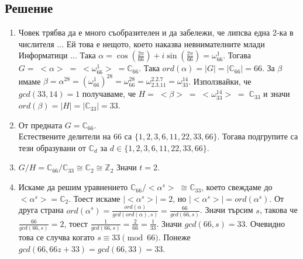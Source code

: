 \documentclass[12pt]{article}
\begin{document}
\subsection{Решение}
\begin{enumerate}[label=\alph*)]
    \item Човек трябва да е много съобразителен и да забележи, че липсва една 2-ка в числителя ... Ей това е нещото, което наказва невнимателните млади Информатици ...
    Така \(\alpha = \cos\left(\displaystyle\frac{2\pi}{66}\right) + i\sin\left(\displaystyle\frac{2\pi}{66}\right) = \omega_{66}^1\).
    Тогава \(G = \; <\alpha> \; = \; <\omega_{66}^1> \; = \mathbb{C}_{66}\).
    Така \(ord(\alpha) = |G| = |\mathbb{C}_{66}| = 66\).
    За \(\beta\) имаме \(\beta = \alpha^{28} = (\omega_{66}^1)^{28} = \omega_{66}^{28} = \omega_{2.3.11}^{2.2.7} = \omega_{33}^{14}\). Използвайки, че \(gcd(33, 14) = 1\) получаваме, че \(H = \; <\beta> \; = \; <\omega_{33}^{14}> \; = \; \mathbb{C}_{33}\) и значи
    \(ord(\beta) = |H| = |\mathbb{C}_{33}| = 33\).
    \item От предната \(G = \mathbb{C}_{66}\). \\
    Естествените делители на \(66\) са \(\{1, 2, 3, 6, 11, 22, 33, 66\}\).
    Тогава подгрупите са тези образувани от \(\mathbb{C}_d\) за \(d \in \{1, 2, 3, 6, 11, 22, 33, 66\}\).
    \item \(G / H = \mathbb{C}_{66} / \mathbb{C}_{33} \cong \mathbb{C}_{2} \cong \mathbb{Z}_2\) Значи \(t = 2\).
    \item Искаме да решим уравнението \(\mathbb{C}_{66} / <\alpha^s> \; \cong \mathbb{C}_{33}\), което свеждаме до \(<\alpha^s> = \mathbb{C}_{2}\).
    Тоест искаме \(|<\alpha^s>| = 2\), но \(|<\alpha^s>| = ord(\alpha^s)\).
    От друга страна \(ord(\alpha^s) = \displaystyle\frac{ord(\alpha)}{gcd(ord(\alpha), s)} = \displaystyle\frac{66}{gcd(66, s)}\). Значи търсим \(s\), такова че
    \(\displaystyle\frac{66}{gcd(66, s)} = 2\), тоест \(\displaystyle\frac{1}{gcd(66, s)} = \displaystyle\frac{2}{66} = \displaystyle\frac{1}{33}\). Значи \(gcd(66, s) = 33\).
    Очевидно това се случва когато \(s \equiv 33 \pmod{66}\). Понеже \(gcd(66, 66z + 33) = gcd(66, 33) = 33\).
\end{enumerate}
\end{document}
